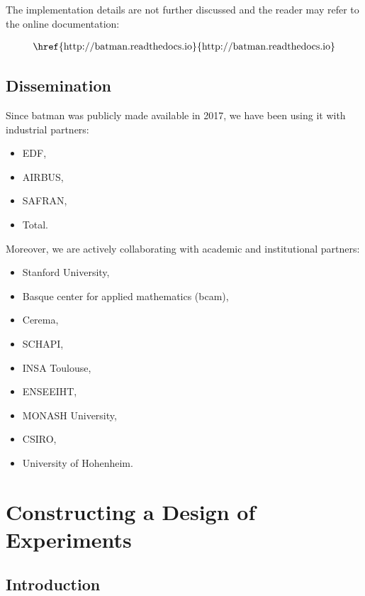 The implementation details are not further discussed and the reader may refer to the online documentation: 

\begin{align}
\text{\href{http://batman.readthedocs.io}{http://batman.readthedocs.io}}	\nonumber
\end{align}
    

\section{Dissemination}

Since batman was publicly made available in 2017, we have been using it with industrial partners:

\begin{itemize}
\item EDF,
\item AIRBUS,
\item SAFRAN,
\item Total.
\end{itemize}

Moreover, we are actively collaborating with academic and institutional partners:

\begin{itemize}
\item Stanford University,
\item Basque center for applied mathematics (bcam),
\item Cerema,
\item SCHAPI,
\item INSA Toulouse,
\item ENSEEIHT,
\item MONASH University,
\item CSIRO,
\item University of Hohenheim.
\end{itemize}

\chapter{Constructing a Design of Experiments}\label{chap:doe}

\section{Introduction}

